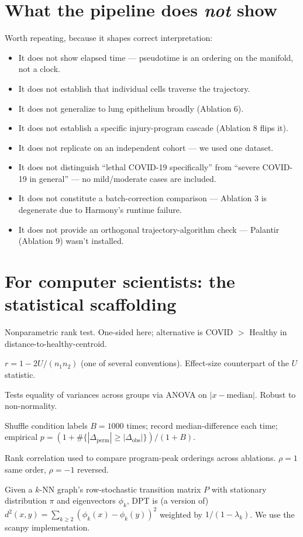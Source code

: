 \documentclass[11pt]{article}
\begin{document}
\section{What the pipeline does \textit{not} show}

Worth repeating, because it shapes correct interpretation:

\begin{itemize}[nosep]
\item It does not show elapsed time --- pseudotime is an ordering on the manifold, not a clock.
\item It does not establish that individual cells traverse the trajectory.
\item It does not generalize to lung epithelium broadly (Ablation 6).
\item It does not establish a specific injury-program cascade (Ablation 8 flips it).
\item It does not replicate on an independent cohort --- we used one dataset.
\item It does not distinguish ``lethal COVID-19 specifically'' from ``severe COVID-19 in general'' --- no mild/moderate cases are included.
\item It does not constitute a batch-correction comparison --- Ablation 3 is degenerate due to Harmony's runtime failure.
\item It does not provide an orthogonal trajectory-algorithm check --- Palantir (Ablation 9) wasn't installed.
\end{itemize}

\section{For computer scientists: the statistical scaffolding}

\begin{description}[style=nextline,leftmargin=1em]
\item[Mann--Whitney $U$.] Nonparametric rank test. One-sided here; alternative is COVID $>$ Healthy in distance-to-healthy-centroid.
\item[Rank-biserial $r$.] $r = 1 - 2U / (n_1 n_2)$ (one of several conventions). Effect-size counterpart of the $U$ statistic.
\item[Levene's test.] Tests equality of variances across groups via ANOVA on $|x - \mathrm{median}|$. Robust to non-normality.
\item[Permutation test.] Shuffle condition labels $B = 1000$ times; record median-difference each time; empirical $p = (1 + \#\{|\Delta_{\text{perm}}| \ge |\Delta_{\text{obs}}|\}) / (1 + B)$.
\item[Spearman $\rho$.] Rank correlation used to compare program-peak orderings across ablations. $\rho = 1$ same order, $\rho = -1$ reversed.
\item[Diffusion pseudotime.] Given a $k$-NN graph's row-stochastic transition matrix $P$ with stationary distribution $\pi$ and eigenvectors $\phi_k$, DPT is (a version of) $d^2(x,y) = \sum_{k\ge 2} (\phi_k(x) - \phi_k(y))^2$ weighted by $1/(1-\lambda_k)$. We use the scanpy implementation.
\end{description}
\end{document}
